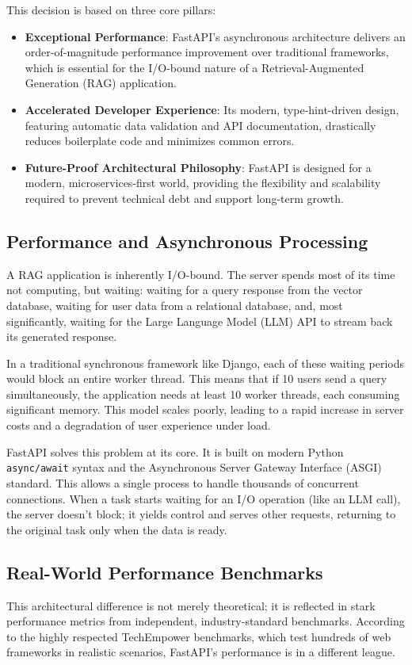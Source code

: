 This decision is based on three core pillars:
\begin{itemize}
    \item \textbf{Exceptional Performance}: FastAPI's asynchronous architecture delivers an order-of-magnitude performance improvement over traditional frameworks, which is essential for the I/O-bound nature of a Retrieval-Augmented Generation (RAG) application.
    \item \textbf{Accelerated Developer Experience}: Its modern, type-hint-driven design, featuring automatic data validation and API documentation, drastically reduces boilerplate code and minimizes common errors.
    \item \textbf{Future-Proof Architectural Philosophy}: FastAPI is designed for a modern, microservices-first world, providing the flexibility and scalability required to prevent technical debt and support long-term growth.
\end{itemize}

\subsection{Performance and Asynchronous Processing}
A RAG application is inherently I/O-bound. The server spends most of its time not computing, but waiting: waiting for a query response from the vector database, waiting for user data from a relational database, and, most significantly, waiting for the Large Language Model (LLM) API to stream back its generated response.

In a traditional synchronous framework like Django, each of these waiting periods would block an entire worker thread. This means that if 10 users send a query simultaneously, the application needs at least 10 worker threads, each consuming significant memory. This model scales poorly, leading to a rapid increase in server costs and a degradation of user experience under load.

FastAPI solves this problem at its core. It is built on modern Python \texttt{async/await} syntax and the Asynchronous Server Gateway Interface (ASGI) standard. This allows a single process to handle thousands of concurrent connections. When a task starts waiting for an I/O operation (like an LLM call), the server doesn't block; it yields control and serves other requests, returning to the original task only when the data is ready.

\subsection{Real-World Performance Benchmarks}
This architectural difference is not merely theoretical; it is reflected in stark performance metrics from independent, industry-standard benchmarks. According to the highly respected TechEmpower benchmarks, which test hundreds of web frameworks in realistic scenarios, FastAPI's performance is in a different league.

